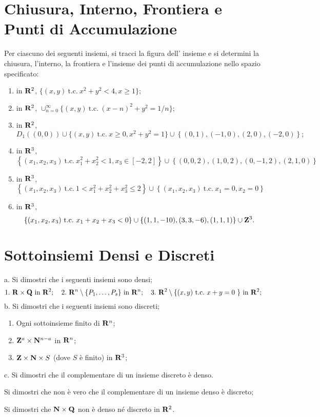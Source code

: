 \documentclass[11pt]{article}\pagestyle{empty}
\begin{document}
\section{Chiusura, Interno, Frontiera e Punti di Accumulazione} 
Per ciascuno dei seguenti insiemi, si tracci la figura dell' insieme e 
si determini la chiusura, l'interno, la frontiera e 
l'insieme dei punti di accumulazione nello spazio specificato:
\begin{enumerate}
\item in ${\bf R}^2$, $\{(x,y)\ \mbox{t.c.}\ x^2+y^2<4, x\geq 1\};$
\item in ${\bf R}^2$, $\cup_{n=0}^\infty \{(x,y)\ \mbox{t.c.}\ (x-n)^2+y^2=1/n\};$
\item in ${\bf R}^2$, 
$$D_1((0,0))\cup\{(x,y)\ \mbox{t.c.}\ x\geq0, x^2+y^2=1\}\cup\left\{(0,1),(-1,0),(2,0),(-2,0)\right\};$$
\item in ${\bf R}^3$,
$$\left\{(x_1,x_2,x_3)\ \mbox{t.c.}\ x_1^2+x_2^2<1, x_3\in[-2,2]\right\}\cup\left\{(0,0,2),(1,0,2),(0,-1,2),(2,1,0)\right\}$$
\item in ${\bf R}^3$,
$$\left\{(x_1,x_2,x_3)\ \mbox{t.c.}\ 1<x_1^2+x_2^2+x_3^2\leq 2\right\}
\cup\left\{(x_1,x_2,x_3)\ \mbox{t.c.}\ x_1=0,x_2=0\right\}$$
\item in ${\bf R}^3$,
$$\left\{(x_1,x_2,x_3)\ \mbox{t.c.}\ x_1+x_2+x_3<0\right\}\cup\{(1,1,-10),(3,3,-6),(1,1,1)\}\cup {\bf Z}^3.$$
\end{enumerate}
\section{Sottoinsiemi Densi e Discreti}
{a.} Si dimostri che i seguenti insiemi sono densi;
$$\mbox{1.}\ {\bf R}\times{\bf Q}\ \mbox{in}\ {\bf R}^2;\ \ \ \mbox{2.}\ {\bf R}^n
\setminus\{P_1,\ldots,P_s\}\ \mbox{in}\ {\bf R}^n;\ \ \ 
\mbox{3.}\ {\bf R}^2\setminus\{(x,y)\ \mbox{t.c.}\ x+y=0\ \}\ \mbox{in}\ {\bf R}^2;$$
{b.} Si dimostri che i seguenti insiemi sono discreti;
\begin{enumerate}
\item Ogni sottoinsieme finito di ${\bf R}^n$;
\item ${\bf Z}^{a}\times{\bf N}^{n-a}$ in ${\bf R}^n$;
\item ${\bf Z}\times{\bf N}\times S$ (dove $S$ \`e finito) in ${\bf R}^3$;
\end{enumerate}
{c.} Si dimostri che il complementare di un insieme discreto \`e denso.

 Si dimostri che non \`e vero che il complementare di un insieme denso \`e 
discreto;

 Si dimostri che ${\bf N}\times{\bf Q}$ non \`e denso n\'e discreto in ${\bf R}^2$.
\end{document}
